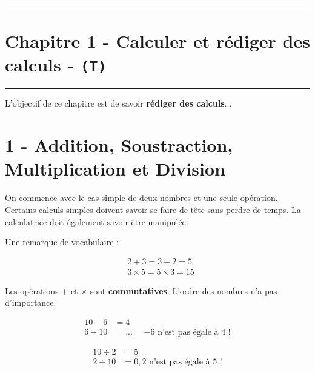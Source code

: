 \documentclass[11pt]{article}
\newcommand{\horrule}[1]{\rule{\linewidth}{#1}} %
\begin{document}

\newtheorem{Definition}{Définition}
\newtheorem{Theorem}{Théorème}
\newtheorem{Proposition}{Propriété}

\renewcommand{\labelitemi}{$\bullet$}
\renewcommand{\labelitemii}{$\circ$}

\setlength{\columnseprule}{1pt}

\horrule{2px}
\section*{Chapitre 1 - Calculer et rédiger des calculs - \texttt{(T)}}
\horrule{2px}

L'objectif de ce chapitre est de savoir \textbf{rédiger des calculs}...

\section*{1 - Addition, Soustraction, Multiplication et Division}

On commence avec le cas simple de deux nombres et une seule opération. Certains calculs simples doivent savoir se faire de tête sans perdre de temps. La calculatrice doit également savoir être manipulée.

Une remarque de vocabulaire :

\begin{align*}
& 2 + 3 = 3 + 2 = 5 \\
& 3 \times 5 = 5 \times 3 = 15
\end{align*}

\reversemarginpar\marginnote{$\Box \Box$}
Les opérations + et $\times$ sont \textbf{commutatives}. L'ordre des nombres n'a pas d'importance. 


\begin{minipage}[t]{0.5\textwidth}\begin{align*}
10 - 6 &= 4\\
6 - 10 &= ... = -6 \text{ n'est pas égale à 4 !}
\end{align*}\end{minipage}
\begin{minipage}[t]{0.5\textwidth}\begin{align*}
10 \div 2 &= 5\\
2 \div 10 &= 0,2 \text{ n'est pas égale à 5 !}
\end{align*}\end{minipage}
\end{document}

